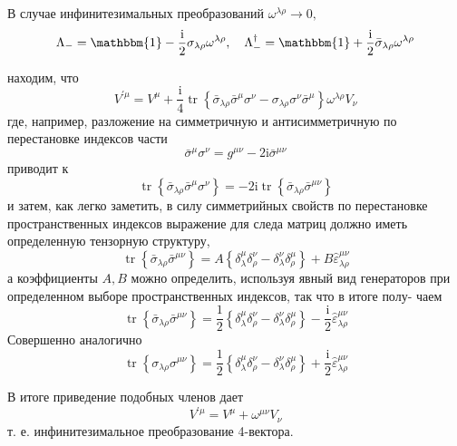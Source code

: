 \documentclass[a4paper,12pt]{article} %
\begin{document}
\begin{task}
В случае инфинитезимальных преобразований $\omega^{\lambda \rho} \rightarrow 0,$
$$
\Lambda_{-}=\mathbbm{1}-\frac{\mathrm{i}}{2} \sigma_{\lambda \rho} \omega^{\lambda \rho}, 
\quad 
\Lambda_{-}^{\dagger}=\mathbbm{1}+\frac{\mathrm{i}}{2} \bar{\sigma}_{\lambda \rho} \omega^{\lambda \rho}
$$


находим, что
$$
V^{\prime \mu}=
V^{\mu}
+
\frac{\mathrm{i}}{4} \operatorname{tr}\left\{
\bar{\sigma}_{\lambda \rho} \bar{\sigma}^{\mu} \sigma^{\nu}-\sigma_{\lambda \rho} \sigma^{\nu} \bar{\sigma}^{\mu}
\right\} \omega^{\lambda \rho} V_{\nu}
$$
где, например, разложение на симметричную и антисимметричную по перестановке индексов части
$$
\bar{\sigma}^{\mu} \sigma^{\nu}=g^{\mu \nu}-2 \mathrm{i} \bar{\sigma}^{\mu \nu}
$$
приводит к
$$
\operatorname{tr}\left\{\bar{\sigma}_{\lambda \rho} \bar{\sigma}^{\mu} \sigma^{\nu}\right\}=-2 \mathrm{i} \operatorname{tr}\left\{\bar{\sigma}_{\lambda \rho} \bar{\sigma}^{\mu \nu}\right\}
$$
и затем, как легко заметить, в силу симметрийных свойств по перестановке пространственных индексов выражение для следа матриц должно иметь
определенную тензорную структуру,
$$
\operatorname{tr}\left\{\bar{\sigma}_{\lambda \rho} \bar{\sigma}^{\mu \nu}\right\}=A\left\{\delta_{\lambda}^{\mu} \delta_{\rho}^{\nu}-\delta_{\lambda}^{\nu} \delta_{\rho}^{\mu}\right\}+B \hat{\varepsilon}_{\lambda \rho}^{\mu \nu}
$$
а коэффициенты $A, B$ можно определить, используя явный вид генераторов при определенном выборе пространственных индексов, так что в итоге полу-
чаем
$$
\operatorname{tr}\left\{\bar{\sigma}_{\lambda \rho} \bar{\sigma}^{\mu \nu}\right\}=\frac{1}{2}\left\{\delta_{\lambda}^{\mu} \delta_{\rho}^{\nu}-\delta_{\lambda}^{\nu} \delta_{\rho}^{\mu}\right\}-\frac{\mathrm{i}}{2} \hat{\varepsilon}_{\lambda \rho}^{\mu \nu}
$$
Совершенно аналогично
$$
\operatorname{tr}\left\{\sigma_{\lambda \rho} \sigma^{\mu \nu}\right\}=\frac{1}{2}\left\{\delta_{\lambda}^{\mu} \delta_{\rho}^{\nu}-\delta_{\lambda}^{\nu} \delta_{\rho}^{\mu}\right\}+\frac{\mathrm{i}}{2} \hat{\varepsilon}_{\lambda \rho}^{\mu \nu}
$$



В итоге приведение подобных членов дает
$$
V^{\prime \mu}=V^{\mu}+\omega^{\mu \nu} V_{\nu}
$$
т. е. инфинитезимальное преобразование 4-вектора.





\end{task}
\end{document}

